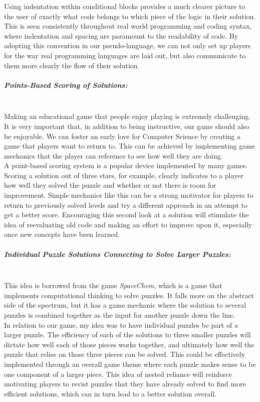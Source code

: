 Using indentation within conditional blocks provides a much clearer picture to the user of exactly what code belongs
to which piece of the logic in their solution. This is seen consistently throughout real world programming and coding
syntax, where indentation and spacing are paramount to the readability of code. By adopting this convention
in our pseudo-language, we can not only set up players for the way real programming languages are laid out, but
also communicate to them more clearly the flow of their solution.\\

\subparagraph{Points-Based Scoring of Solutions:}\mbox{} \\
Making an educational game that people enjoy playing is extremely challenging. It is very important that, in addition
to being instructive, our game should also be enjoyable. We can foster an early love for Computer Science by
creating a game that players want to return to. This can be achieved by implementing game mechanics that the
player can reference to see how well they are doing.\\

A point-based scoring system is a popular device implemented by many games. Scoring a solution out of three stars,
for example, clearly indicates to a player how well they solved the puzzle and whether or not there is room for
improvement. Simple mechanics like this can be a strong motivator for players to return to previously solved levels
and try a different approach in an attempt to get a better score. Encouraging this second look at a solution will
stimulate the idea of reevaluating old code and making an effort to improve upon it, especially once new concepts
have been learned.\\

\subparagraph{Individual Puzzle Solutions Connecting to Solve Larger Puzzles:}\mbox{} \\
This idea is borrowed from the game \textit{SpaceChem}, which is a game that implements computational thinking
to solve puzzles. It falls more on the abstract side of the spectrum, but it has a game mechanic where the solution to
several puzzles is combined together as the input for another puzzle down the line.\\

In relation to our game, my idea was to have individual puzzles be part of a larger puzzle. The efficiency of each
of the solutions to three smaller puzzles will dictate how well each of those pieces works together, and ultimately
how well the puzzle that relies on those three pieces can be solved. This could be effectively implemented through
an overall game theme where each puzzle makes sense to be one component of a larger piece. This idea of nested
reliance will reinforce motivating players to revist puzzles that they have already solved to find more efficient solutions,
which can in turn lead to a better solution overall.\\

